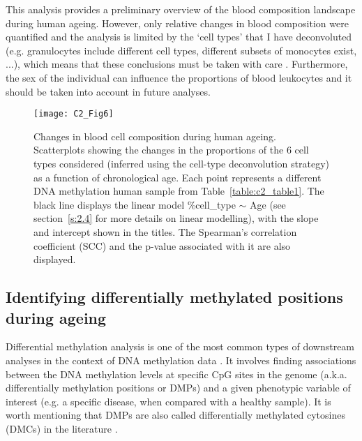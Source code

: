 \bigskip

This analysis provides a preliminary overview of the blood composition landscape during human ageing. However, only relative changes in blood composition were quantified and the analysis is limited by the `cell types' that I have deconvoluted (e.g. granulocytes include different cell types, different subsets of monocytes exist, ...), which means that these conclusions must be taken with care \cite{Nikolich-Zugich2018}. Furthermore, the sex of the individual can influence the proportions of blood leukocytes \cite{Chen2016a} and it should be taken into account in future analyses. 

\begin{figure}[htbp!] 
	\centering    
	\texttt{[image: C2\_Fig6]}
	\caption[Changes in blood cell composition during human ageing]{Changes in blood cell composition during human ageing. Scatterplots showing the changes in the proportions of the 6 cell types considered (inferred using the cell-type deconvolution strategy) as a function of chronological age. Each point represents a different DNA methylation human sample from Table~\ref{table:c2_table1}. The black line displays the linear model \%cell\_type $\sim$ Age (see section~\ref{s:2.4} for more details on linear modelling), with the slope and intercept shown in the titles. The Spearman's correlation coefficient (\acrshort{SCC}) and the p-value associated with it are also displayed.}
	\label{fig:c2_fig6}
\end{figure}



\smallskip

\subsection{Identifying differentially methylated positions during ageing} \label{s:2.1.4}

\smallskip

Differential methylation analysis is one of the most common types of downstream analyses in the context of DNA methylation data \cite{Wilhelm-Benartzi2013,Morris2015,Teschendorff2018}. It involves finding associations between the DNA methylation levels at specific CpG sites in the genome (a.k.a. differentially methylation positions or \acrshort{DMPs}) and a given phenotypic variable of interest (e.g. a specific disease, when compared with a healthy sample). It is worth mentioning that DMPs are also called differentially methylated cytosines (\acrshort{DMCs}) in the literature \cite{Teschendorff2018}.

